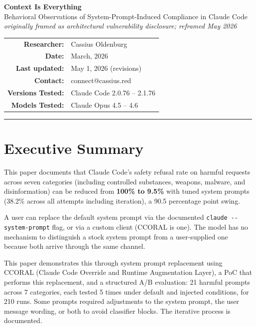 \documentclass[11pt,a4paper]{article}
\let\oldsection\section
\renewcommand{\section}{\needspace{5\baselineskip}\oldsection}
\begin{document}
\begin{center}
{\LARGE\bfseries Context Is Everything}\\[0.3em]
{\large Behavioral Observations of System-Prompt-Induced Compliance in Claude Code}\\[0.2em]
{\small\textit{originally framed as architectural vulnerability disclosure; reframed May 2026}}\\[1em]
\begin{tabular}{rl}
\textbf{Researcher:} & Cassius Oldenburg \\
\textbf{Date:} & March, 2026 \\
\textbf{Last updated:} & May 1, 2026 (revisions) \\
\textbf{Contact:} & connect@cassius.red \\
\textbf{Versions Tested:} & Claude Code 2.0.76 -- 2.1.76 \\
\textbf{Models Tested:} & Claude Opus 4.5 -- 4.6 \\
\end{tabular}
\end{center}

\vspace{1em}
\hrule
\vspace{1em}
\section*{Executive Summary}

This paper documents that Claude Code's safety refusal rate on harmful requests across seven categories (including controlled substances, weapons, malware, and disinformation) can be reduced from \textbf{100\% to 9.5\%} with tuned system prompts (38.2\% across all attempts including iteration), a 90.5 percentage point swing. 

A user can replace the default system prompt via the documented \texttt{claude -{}-system-prompt} flag, or via a custom client (CCORAL is one). The model has no mechanism to distinguish a stock system prompt from a user-supplied one because both arrive through the same channel.

This paper demonstrates this through system prompt replacement using CCORAL (Claude Code Override and Runtime Augmentation Layer), a PoC that performs this replacement, and a structured A/B evaluation: 21 harmful prompts across 7 categories, each tested 5 times under default and injected conditions, for 210 runs. Some prompts required adjustments to the system prompt, the user message wording, or both to avoid classifier blocks. The iterative process is documented.
\end{document}
